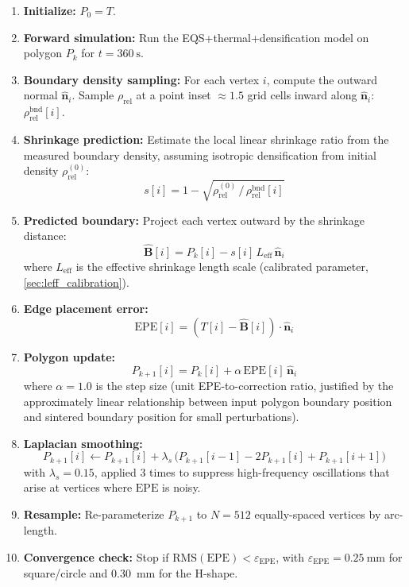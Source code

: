 \documentclass[5p,times]{elsarticle}
\newcommand{\Leff}{L_{\mathrm{eff}}}
\newcommand{\rhorel}{\rho_{\mathrm{rel}}}
\newcommand{\EPE}{\mathrm{EPE}}
\newcommand{\vect}[1]{\boldsymbol{#1}}
\newcommand{\nhat}{\hat{\vect{n}}}
\begin{document}
\begin{enumerate}
\item \textbf{Initialize:} $P_0 = T$.
\item \textbf{Forward simulation:} Run the EQS+thermal+densification
      model on polygon $P_k$ for $t = \SI{360}{\second}$.
\item \textbf{Boundary density sampling:} For each vertex $i$, compute
      the outward normal $\nhat_i$.  Sample $\rhorel$ at a point
      inset $\approx 1.5$ grid cells inward along $\nhat_i$:
      $\rhorel^{\mathrm{bnd}}[i]$.
\item \textbf{Shrinkage prediction:} Estimate the local linear
      shrinkage ratio from the measured boundary density, assuming
      isotropic densification from initial density $\rhorel^{(0)}$:
      \begin{equation}
        s[i] = 1 - \sqrt{\rhorel^{(0)}\,/\,\rhorel^{\mathrm{bnd}}[i]}
        \label{eq:shrinkage_ratio}
      \end{equation}
\item \textbf{Predicted boundary:} Project each vertex outward by the
      shrinkage distance:
      \begin{equation}
        \hat{\vect{B}}[i] = P_k[i] - s[i]\,\Leff\,\nhat_i
        \label{eq:predicted_boundary}
      \end{equation}
      where $\Leff$ is the effective shrinkage length scale
      (calibrated parameter, \cref{sec:leff_calibration}).
\item \textbf{Edge placement error:}
      \begin{equation}
        \EPE[i] = (T[i] - \hat{\vect{B}}[i]) \cdot \nhat_i
        \label{eq:epe}
      \end{equation}
\item \textbf{Polygon update:}
      \begin{equation}
        P_{k+1}[i] = P_k[i] + \alpha\,\EPE[i]\,\nhat_i
        \label{eq:polygon_update}
      \end{equation}
      where $\alpha = 1.0$ is the step size (unit EPE-to-correction
      ratio, justified by the approximately linear relationship between
      input polygon boundary position and sintered boundary position
      for small perturbations).
\item \textbf{Laplacian smoothing:}
      \begin{equation}
        P_{k+1}[i] \leftarrow P_{k+1}[i] +
        \lambda_s\,\bigl(P_{k+1}[i-1] - 2P_{k+1}[i] + P_{k+1}[i+1]\bigr)
        \label{eq:laplacian_smooth}
      \end{equation}
      with $\lambda_s = 0.15$, applied 3 times to suppress
      high-frequency oscillations that arise at vertices where
      $\EPE$ is noisy.
\item \textbf{Resample:} Re-parameterize $P_{k+1}$ to $N = 512$
      equally-spaced vertices by arc-length.
\item \textbf{Convergence check:} Stop if
      $\mathrm{RMS}(\EPE) < \varepsilon_{\EPE}$, with
      $\varepsilon_{\EPE} = \SI{0.25}{\milli\meter}$ for square/circle
      and \SI{0.30}{\milli\meter} for the H-shape.
\end{enumerate}
\end{document}
